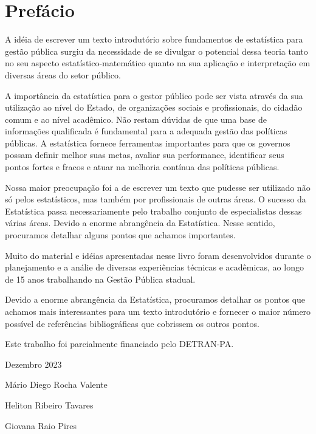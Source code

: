 \chapter*{Prefácio}

\inic A idéia de escrever um texto introdutório sobre fundamentos de estatística para gestão pública surgiu da necessidade de se divulgar o potencial dessa teoria tanto no
seu aspecto estatístico-matemático quanto na sua aplicação e
interpretação em diversas áreas do setor público.\vskip0.3cm



A importância da estatística para o gestor público pode ser vista através da sua
utilização ao nível do Estado, de organizações sociais e profissionais, do cidadão comum e ao nível acadêmico. Não restam dúvidas de que uma base de informações qualificada é fundamental para a adequada gestão das políticas públicas.  A estatística fornece ferramentas importantes para que os governos possam definir melhor suas metas, avaliar sua performance, identificar seus pontos fortes e fracos e atuar na melhoria contínua das políticas públicas.
\vskip0.3cm

Nossa maior preocupação foi a de escrever um texto que pudesse ser
utilizado não só pelos estatísticos, mas também por profissionais de outras áreas. O sucesso da Estatística passa necessariamente
pelo trabalho conjunto de especialistas dessas várias áreas. Devido
a enorme abrangência da Estatística. Nesse sentido, procuramos detalhar
alguns pontos que achamos importantes. \vst

Muito do material e idéias apresentadas nesse livro foram
desenvolvidos durante o planejamento e a análie de diversas experiências técnicas e acadêmicas, ao longo de 15 anos trabalhando na Gestão Pública stadual.
\vst 

\newpage


Devido a enorme abrangência da Estatística, procuramos detalhar os pontos
que achamos mais interessantes para um texto introdutório e
fornecer o maior número possível de referências bibliográficas que
cobrissem os outros pontos.\vst

Este trabalho foi parcialmente financiado pelo DETRAN-PA.

\vst

\begin{centering}

\vst

Dezembro 2023 
\vsm

Mário Diego Rocha Valente

Heliton Ribeiro Tavares

Giovana Raio Pires


\end{centering}
